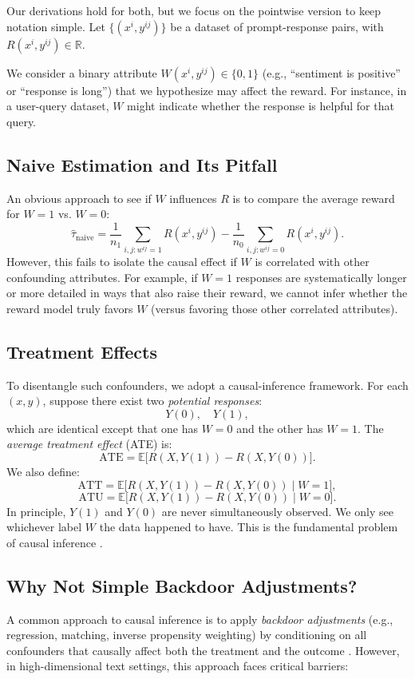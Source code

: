 \documentclass{article}
\theoremstyle{definition}
\newcommand{\E}{\mathbb{E}}
\begin{document}
Our derivations hold for both, but we focus on the pointwise version to keep notation simple. Let $\{(x^i, y^{ij})\}$ be a dataset of prompt-response pairs, with $R(x^i, y^{ij}) \in \mathbb{R}$.

We consider a binary attribute $W(x^i, y^{ij}) \in \{0,1\}$ (e.g., ``sentiment is positive'' or ``response is long'') that we hypothesize may affect the reward. For instance, in a user-query dataset, $W$ might indicate whether the response is helpful for that query.

\subsection{Naive Estimation and Its Pitfall}
An obvious approach to see if $W$ influences $R$ is to compare the average reward for $W=1$ vs. $W=0$:
\[
\hat{\tau}_{\text{naive}} 
= \frac{1}{n_1}\sum_{i,j: w^{ij}=1} R(x^i, y^{ij})
- \frac{1}{n_0}\sum_{i,j: w^{ij}=0} R(x^i, y^{ij}).
\]
However, this fails to isolate the causal effect if $W$ is correlated with other confounding attributes. For example, if $W=1$ responses are systematically longer or more detailed in ways that also raise their reward, we cannot infer whether the reward model truly favors $W$ (versus favoring those other correlated attributes).

\subsection{Treatment Effects}
To disentangle such confounders, we adopt a causal-inference framework. For each $(x, y)$, suppose there exist two \emph{potential responses}:
\[
Y(0), \quad Y(1),
\]
which are identical except that one has $W=0$ and the other has $W=1$. The \emph{average treatment effect} (ATE) is:
\[
\text{ATE} 
= \E\bigl[R(X, Y(1)) - R(X, Y(0))\bigr].
\]
We also define:
\[
\text{ATT} = \E\bigl[R(X, Y(1)) - R(X, Y(0)) \;\big|\; W=1\bigr],
\]
\[
\text{ATU} = \E\bigl[R(X, Y(1)) - R(X, Y(0)) \;\big|\; W=0\bigr].
\]
In principle, $Y(1)$ and $Y(0)$ are never simultaneously observed. We only see whichever label $W$ the data happened to have. This is the fundamental problem of causal inference \cite{imbens2015causal}.

\subsection{Why Not Simple Backdoor Adjustments?}
\label{sec:why_not_backdoor}
A common approach to causal inference is to apply \emph{backdoor adjustments} (e.g., regression, matching, inverse propensity weighting) by conditioning on all confounders that causally affect both the treatment and the outcome \cite{cinelli2024crash}. However, in high-dimensional text settings, this approach faces critical barriers:
\end{document}
